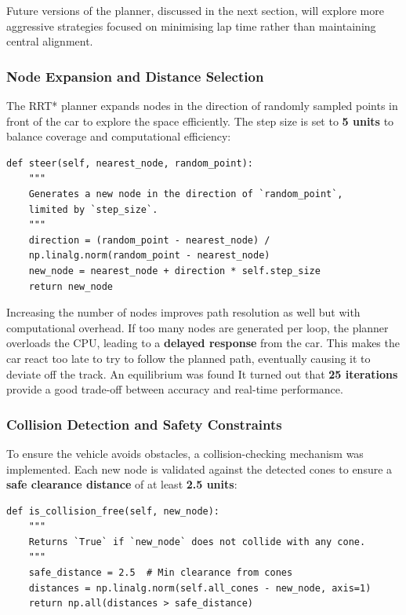 \documentclass[a4paper,11pt]{report}
\begin{document}
Future versions of the planner, discussed in the next section, will explore more 
aggressive strategies focused on minimising lap time rather than maintaining central alignment.


\subsubsection*{Node Expansion and Distance Selection}

The RRT* planner expands nodes in the direction of randomly sampled 
points in front of the car to explore the space efficiently. The step size is set to \textbf{5 units} 
to balance coverage and computational efficiency:

\begin{verbatim}
def steer(self, nearest_node, random_point):
    """
    Generates a new node in the direction of `random_point`, 
    limited by `step_size`.
    """
    direction = (random_point - nearest_node) / 
    np.linalg.norm(random_point - nearest_node)
    new_node = nearest_node + direction * self.step_size
    return new_node
\end{verbatim}

Increasing the number of nodes improves path resolution as well but with
computational overhead. If too many nodes are generated per loop, 
the planner overloads the CPU, leading to a \textbf{delayed response} from the car. 
This makes the car react too late to try to follow the planned path, eventually causing it
to deviate off the track. An equilibrium was found
It turned out that \textbf{25 iterations} provide a good trade-off between accuracy and real-time performance.

\subsubsection*{Collision Detection and Safety Constraints}

To ensure the vehicle avoids obstacles, a collision-checking mechanism was implemented. 
Each new node is validated against the detected cones to ensure a \textbf{safe clearance distance} of at least \textbf{2.5 units}:

\begin{verbatim}
def is_collision_free(self, new_node):
    """
    Returns `True` if `new_node` does not collide with any cone.
    """
    safe_distance = 2.5  # Min clearance from cones
    distances = np.linalg.norm(self.all_cones - new_node, axis=1)
    return np.all(distances > safe_distance)
\end{verbatim}
\end{document}
